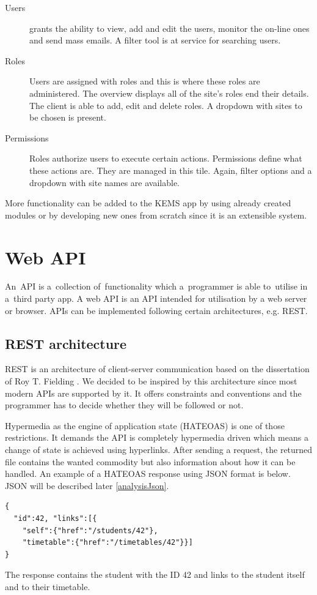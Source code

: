 \begin{description}
\begin {description}
	\item [Users] grants the ability to view, add and edit the users, monitor the on-line ones and send mass emails. A filter tool is at service for searching users.
	\item [Roles] Users are assigned with roles and this is where these roles are administered. The overview displays all of the site's roles end their details. The client is able to add, edit and delete roles. A dropdown with sites to be chosen is present. 
	\item [Permissions] Roles authorize users to execute certain actions. Permissions define what these actions are. They are managed in this tile. Again, filter options and a dropdown with site names are available. 
	\end{description}
\end{description}
More functionality can be added to the KEMS app by using already created modules or by developing new ones from scratch since it is an extensible system.

\section{Web API} \label{analysisWebAPI}
An~API is a~collection of~functionality which a~programmer is able to~utilise in a~third party app. A web API is an API intended for utilisation by a web server or browser. APIs can be implemented following certain architectures, e.g. REST.
\subsection{REST architecture} \label{analysisREST} \cite{rest}
REST is an architecture of client-server communication based on the dissertation of Roy T. Fielding \cite{fieldingDissertation}. We decided to be inspired by this architecture since most modern APIs are supported by it. It offers constraints and conventions and the programmer has to decide whether they will be followed or not. 

\cite{hateoas} Hypermedia as the engine of application state (HATEOAS) is one of those restrictions. It demands the API is completely hypermedia driven which means a change of state is achieved using hyperlinks. After sending a request, the returned file contains the wanted commodity but also information about how it can be handled. \linebreak[4] An example of a HATEOAS response using JSON format is below. JSON will be described later \ref{analysisJson}.
\lstset{style=sharpc, numbers=none}
\begin{lstlisting}
{
  "id":42, "links":[{ 
	"self":{"href":"/students/42"}, 
	"timetable":{"href":"/timetables/42"}}]
}
\end{lstlisting}
The response contains the student with the ID 42 and links to \linebreak[4] the student itself and to their timetable. 

